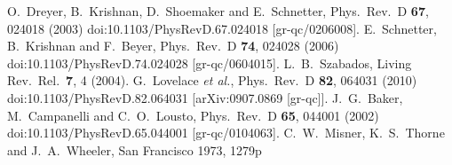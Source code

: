 \begin{thebibliography}{9}
O.~Dreyer, B.~Krishnan, D.~Shoemaker and E.~Schnetter,
  Phys.\ Rev.\ D {\bf 67}, 024018 (2003)
  doi:10.1103/PhysRevD.67.024018
  [gr-qc/0206008].
  E.~Schnetter, B.~Krishnan and F.~Beyer,
  Phys.\ Rev.\ D {\bf 74}, 024028 (2006)
  doi:10.1103/PhysRevD.74.024028
  [gr-qc/0604015].
  L.~B.~Szabados,
  Living Rev.\ Rel.\  {\bf 7}, 4 (2004).
  G.~Lovelace {\it et al.},
  Phys.\ Rev.\ D {\bf 82}, 064031 (2010)
  doi:10.1103/PhysRevD.82.064031
  [arXiv:0907.0869 [gr-qc]].
  J.~G.~Baker, M.~Campanelli and C.~O.~Lousto,
  Phys.\ Rev.\ D {\bf 65}, 044001 (2002)
  doi:10.1103/PhysRevD.65.044001
  [gr-qc/0104063].
  C.~W.~Misner, K.~S.~Thorne and J.~A.~Wheeler,
  San Francisco 1973, 1279p


\end{thebibliography}



